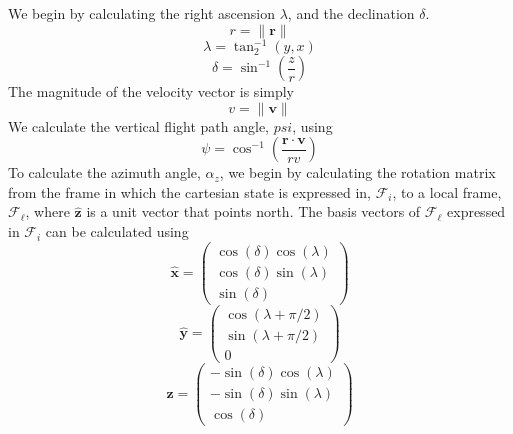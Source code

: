 We begin by calculating the right ascension $\lambda$, and the
declination $\delta$.
%
\begin{equation}
    r = \| \mathbf{r} \| \label{Eq:Sphericalr}
\end{equation}
%
\begin{equation}
    \lambda= \tan^{-1}_2(y,x) \label{Eq:Sphericallambda}
\end{equation}
%
\begin{equation}
    \delta = \sin^{-1}(\frac{z}{r}) \label{Eq:Sphericaldelta}
\end{equation}
%
The magnitude of the velocity vector is simply
%
\begin{equation}
    v = \| \mathbf{v} \|  \label{Eq:Sphericalv}
\end{equation}
%
We calculate the vertical flight path angle, $psi$, using
%
\begin{equation}
    \psi = \cos^{-1}\left(  \frac{\mathbf{r} \cdot \mathbf{v} }{r v} \right)
\end{equation}
%
To calculate the azimuth angle, $\alpha_z$, we begin by
calculating the rotation matrix from the frame in which the
cartesian state is expressed in, $\mathcal{F}_{i}$, to a local
frame, $\mathcal{F}_{\ell}$, where $\hat{\mathbf{z}}$ is a unit
vector that points north.  The basis vectors of
$\mathcal{F}_{\ell}$ expressed in $\mathcal{F}_{i}$ can be
calculated using
%
\begin{equation}
    \hat{\mathbf{x}} =
    \begin{pmatrix}
        \cos(\delta)\cos(\lambda)\\
         \cos(\delta)\sin(\lambda)\\
          \sin(\delta)
    \end{pmatrix} \label{Eq:SphericalAZFPAx}
\end{equation}
%
\begin{equation}
    \hat{\mathbf{y}} =
    \begin{pmatrix}
          \cos(\lambda + \pi/2)\\
          \sin(\lambda + \pi/2)\\
          0
    \end{pmatrix}  \label{Eq:SphericalAZFPAy}
\end{equation}
%
\begin{equation}
    \hat{\mathbf{z}} =
    \begin{pmatrix}
          -\sin(\delta)\cos(\lambda)\\
          -\sin(\delta)\sin(\lambda)\\
          \cos(\delta)
    \end{pmatrix}  \label{Eq:SphericalAZFPAz}
\end{equation}
